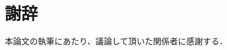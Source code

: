 \documentclass[a4j,11pt,oneside,openany,report,draft]{jsbook}
\begin{document}

\backmatter
\chapter{謝辞}
本論文の執筆にあたり、議論して頂いた関係者に感謝する．




\begin{thebibliography}{99}
  
\end{thebibliography}
\end{document}
